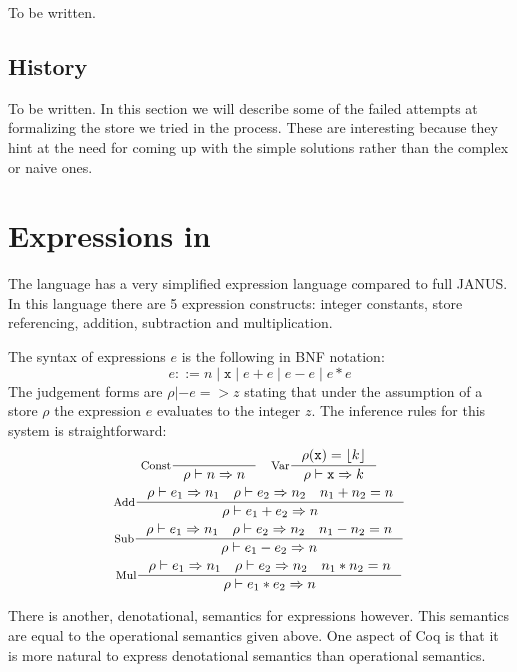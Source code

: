 
To be written.



\subsection{History}

To be written. In this section we will describe some of the failed
attempts at formalizing the store we tried in the process. These are
interesting because they hint at the need for coming up with the
simple solutions rather than the complex or naive ones.

\section{Expressions in \janusz{}}

The \janusz{} language has a very simplified expression language
compared to full JANUS. In this language there are 5 expression
constructs: integer constants, store referencing, addition,
subtraction and multiplication.

The syntax of expressions $e$ is the following in BNF notation:
\newcommand{\bor}{\; | \;}
\begin{equation*}
  e ::= n \bor \mathtt{x} \bor e + e \bor e - e \bor e * e
\end{equation*}
The judgement forms are $\rho |- e => z$ stating that under the
assumption of a store $\rho$ the expression $e$ evaluates to the
integer $z$. The inference rules for this system is straightforward:
\begin{gather*}
  \inference[Const]{}{\rho |- n => n} \quad \inference[Var]{\rho(\mathtt{x}) =
    \lift{k}}{\rho |- \mathtt{x} => k} \\
  \inference[Add]{\rho |- e_1 => n_1 \quad \rho |- e_2 => n_2 \quad
    n_1 + n_2 = n}{\rho |- e_1 + e_2 => n} \\
  \inference[Sub]{\rho |- e_1 => n_1 \quad \rho |- e_2 => n_2 \quad
    n_1 - n_2 = n}{\rho |- e_1 - e_2 => n} \\
  \inference[Mul]{\rho |- e_1 => n_1 \quad \rho |- e_2 => n_2 \quad
    n_1 * n_2 = n}{\rho |- e_1 * e_2 => n}
\end{gather*}

There is another, denotational, semantics for expressions
however. This semantics are equal to the operational semantics given
above. One aspect of Coq is that it is more natural to express
denotational semantics than operational semantics.

